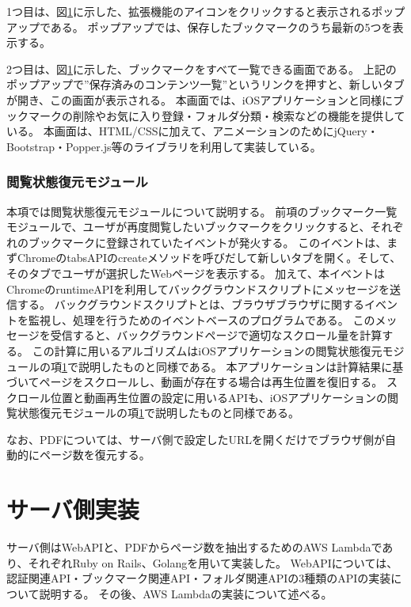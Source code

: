 1つ目は、図\ref{}に示した、拡張機能のアイコンをクリックすると表示されるポップアップである。
ポップアップでは、保存したブックマークのうち最新の5つを表示する。

2つ目は、図\ref{}に示した、ブックマークをすべて一覧できる画面である。
上記のポップアップで”保存済みのコンテンツ一覧”というリンクを押すと、新しいタブが開き、この画面が表示される。
本画面では、iOSアプリケーションと同様にブックマークの削除やお気に入り登録・フォルダ分類・検索などの機能を提供している。
本画面は、HTML/CSSに加えて、アニメーションのためにjQuery\cite{}・Bootstrap\cite{}・Popper.js\cite{}等のライブラリを利用して実装している。


\subsubsection{閲覧状態復元モジュール}
本項では閲覧状態復元モジュールについて説明する。
前項のブックマーク一覧モジュールで、ユーザが再度閲覧したいブックマークをクリックすると、それぞれのブックマークに登録されていたイベントが発火する。
このイベントは、まずChromeのtabsAPIのcreateメソッドを呼びだして新しいタブを開く。そして、そのタブでユーザが選択したWebページを表示する。
加えて、本イベントはChromeのruntimeAPI\cite{}を利用してバックグラウンドスクリプト\cite{}にメッセージを送信する。
バックグラウンドスクリプトとは、ブラウザブラウザに関するイベントを監視し、処理を行うためのイベントベースのプログラムである\cite{}。
このメッセージを受信すると、バックグラウンドページで適切なスクロール量を計算する。
この計算に用いるアルゴリズムはiOSアプリケーションの閲覧状態復元モジュールの項\ref{}で説明したものと同様である。
本アプリケーションは計算結果に基づいてページをスクロールし、動画が存在する場合は再生位置を復旧する。
スクロール位置と動画再生位置の設定に用いるAPIも、iOSアプリケーションの閲覧状態復元モジュールの項\ref{}で説明したものと同様である。

なお、PDFについては、サーバ側で設定したURLを開くだけでブラウザ側が自動的にページ数を復元する。

\section{サーバ側実装}
サーバ側はWebAPIと、PDFからページ数を抽出するためのAWS Lambdaであり、それぞれRuby on Rails、Golangを用いて実装した。
WebAPIについては、認証関連API・ブックマーク関連API・フォルダ関連APIの3種類のAPIの実装について説明する。
その後、AWS Lambdaの実装について述べる。

